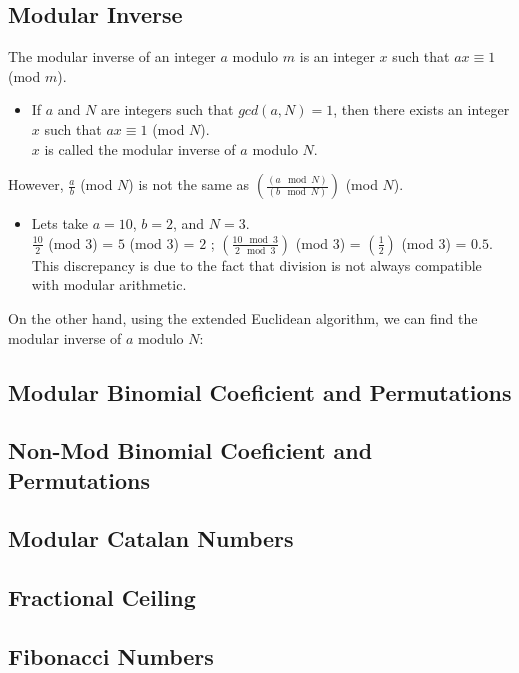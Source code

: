 \subsection{Modular Inverse}
\begin{justify}
The modular inverse of an integer $a$ modulo $m$ is an integer $x$ such that $ax \equiv 1$ (mod $m$).\\
\begin{itemize}
\item If $a$ and $N$ are integers such that $gcd(a, N) = 1$, then there exists an integer $x$ such that $ax \equiv 1$ (mod $N$).\\
$x$ is called the modular inverse of $a$ modulo $N$.
\end{itemize}
However, $\frac{a}{b}$ (mod $N$) is not the same as $(\frac{(a \mod N)}{(b \mod N)})$ (mod $N$).\\
\begin{itemize}
\item Lets take $a = 10$, $b = 2$, and $N = 3$.\\
$\frac{10}{2}$ (mod $3$) = $5$ (mod $3$) = $2$ ; $(\frac{10 \mod 3}{2 \mod 3})$ (mod $3$) = $(\frac{1}{2})$ (mod $3$) = $0.5$.\\
This discrepancy is due to the fact that division is not always compatible with modular arithmetic.
\end{itemize}
On the other hand, using the extended Euclidean algorithm, we can find the modular inverse of $a$ modulo $N$:
\end{justify}
\subsection{Modular Binomial Coeficient and Permutations}
\subsection{Non-Mod Binomial Coeficient and Permutations}
\subsection{Modular Catalan Numbers}
\subsection{Fractional Ceiling}
\subsection{Fibonacci Numbers}
